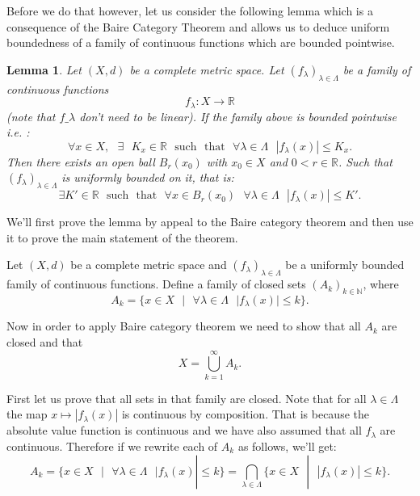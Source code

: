 \documentclass[11pt]{article}
\newcommand\st{\text{ } | \text{ }}
\newcommand\R{\mathbb{R}}
\newcommand\N{\mathbb{N}}
\newcommand\sucht{\sep \mathrm{such} \sep \mathrm{that} \sep}
\newcommand\sep{\text{ }}
\newtheorem*{lemma}{Lemma}
\begin{document}
Before we do that however, let us consider the following lemma which
is a consequence of the Baire Category Theorem and allows us to deduce uniform
boundedness of a family of continuous functions which are bounded pointwise.

\begin{lemma}
  Let $\left( X, d \right) $ be a complete metric space. Let
  $\left( f_\lambda \right)_{\lambda \in \Lambda} $ be a family of continuous
  functions $$f_\lambda : X \to \R $$ (note that $f\_\lambda$ don't need to be linear).
  If the family above is bounded pointwise i.e. :
  \[
    \forall x \in X, \sep \exists \sep K_x \in \R \sucht \forall \lambda \in \Lambda \sep |f_\lambda(x)| \le K_x
  .\]
  Then there exists an open ball $B_r(x_0)$ with  $x_0 \in X$ and  $0 < r \in \R$.
  Such that $\left( f_\lambda \right)_{\lambda \in \Lambda} $ is uniformly bounded
  on it, that is:
  \[
    \exists K' \in \R \sucht \forall x \in B_r(x_0) \sep \forall \lambda \in \Lambda \sep |f_\lambda(x) | \le K'
  .\]
\end{lemma}

We'll first prove the lemma by appeal to the Baire category theorem and then
use it to prove the main statement of the theorem.

Let $\left( X, d \right) $ be a complete metric space and
$\left( f_\lambda \right)_{\lambda \in \Lambda} $ be a uniformly bounded family of continuous
functions. Define a family of closed sets $\left( A_k \right)_{k \in \N} $, where
\[
  A_k = \lbrace x \in X \st \forall \lambda \in \Lambda \sep | f_\lambda (x) | \le k \rbrace
.\]

Now in order to apply Baire category theorem we need to show that  all $A_k$ are
closed and that
\begin{equation}
X = \bigcup_{k = 1}^\infty A_k
.\end{equation}

First let us prove that all sets in that family are closed. Note that for all $\lambda \in \Lambda$ the map
 $x \mapsto |f_\lambda(x)| $ is continuous by composition. That is because the
 absolute value function is continuous and we have also assumed that all  $f_\lambda$
 are continuous. Therefore if we rewrite each of  $A_k$ as follows, we'll get:
  \[
    A_k = \lbrace x \in X \st \forall \lambda \in \Lambda \sep | f_\lambda (x) | \le k \rbrace = \bigcap_{\lambda \in \Lambda} \lbrace x \in X \st |f_\lambda(x)| \le k\rbrace
 .\]
\end{document}
